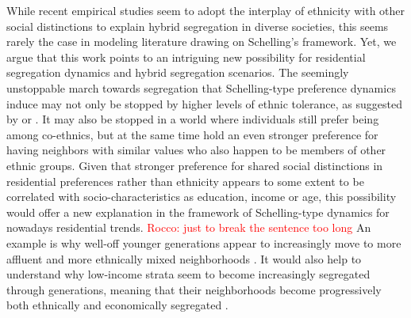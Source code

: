 \documentclass[
]{article}
\begin{document}
While recent empirical studies seem to adopt the interplay of ethnicity
with other social distinctions to explain hybrid segregation in diverse
societies, this seems rarely the case in modeling literature drawing on
Schelling's framework. Yet, we argue that this work points to an
intriguing new possibility for residential segregation dynamics and
hybrid segregation scenarios. The seemingly unstoppable march towards
segregation that Schelling-type preference dynamics induce may not only
be stopped by higher levels of ethnic tolerance, as suggested by
\cite{xie2012modeling} or \cite{hatna2014combining}. It may also be
stopped in a world where individuals still prefer being among
co-ethnics, but at the same time hold an even stronger preference for
having neighbors with similar values who also happen to be members of
other ethnic groups. Given that stronger preference for shared social
distinctions in residential preferences rather than ethnicity appears to
some extent to be correlated with socio-characteristics as education,
income or age, this possibility would offer a new explanation in the
framework of Schelling-type dynamics for nowadays residential trends.
{\textcolor{red}{Rocco: just to break the sentence too long}} An example
is why well-off younger generations appear to increasingly move to more
affluent and more ethnically mixed neighborhoods
\citep{clark2018can,clark2002residential}. It would also help to
understand why low-income strata seem to become increasingly segregated
through generations, meaning that their neighborhoods become
progressively both ethnically and economically segregated
\citep{clark2002residential}.
\end{document}
